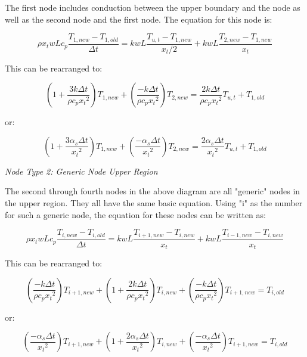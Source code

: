 The first node includes conduction between the upper boundary and the node as well as the second node and the first node.  The equation for this node is:

\begin{equation}
\rho x_t w L c_p \frac{T_{1,new} - T_{1,old}}{\Delta t} = k w L \frac{T_{u,t}-T_{1,new}}{x_t / 2} + k w L \frac{T_{2,new}-T_{1,new}}{x_t}
\end{equation}

This can be rearranged to:

\begin{equation}
(1 + \frac{3 k \Delta t}{\rho c_p {x_t}^2}) T_{1,new} + (\frac{-k \Delta t}{\rho c_p {x_t}^2}) T_{2,new} = \frac{2 k \Delta t}{\rho c_p {x_t}^2} T_{u,t} + T_{1,old}
\end{equation}

or:

\begin{equation}
(1 + \frac{3 \alpha_s \Delta t}{{x_t}^2}) T_{1,new} + (\frac{-\alpha_s \Delta t}{{x_t}^2}) T_{2,new} = \frac{2 \alpha_s \Delta t}{{x_t}^2} T_{u,t} + T_{1,old}
\end{equation}


\emph{\textit{Node Type 2: Generic Node Upper Region}}

The second through fourth nodes in the above diagram are all "generic" nodes in the upper region.  They all have the same basic equation.  Using "i" as the number for such a generic node, the equation for these nodes can be written as:

\begin{equation}
\rho x_t w L c_p \frac{T_{i,new} - T_{i,old}}{\Delta t} = k w L \frac{T_{i+1,new}-T_{i,new}}{x_t} + k w L \frac{T_{i-1,new}-T_{i,new}}{x_t}
\end{equation}

This can be rearranged to:

\begin{equation}
(\frac{-k \Delta t}{\rho c_p {x_t}^2}) T_{i+1,new} + (1 + \frac{2 k \Delta t}{\rho c_p {x_t}^2}) T_{i,new} + (\frac{-k \Delta t}{\rho c_p {x_t}^2}) T_{i+1,new} = T_{i,old}
\end{equation}

or:

\begin{equation}
(\frac{-\alpha_s \Delta t}{{x_t}^2}) T_{i+1,new} + (1 + \frac{2 \alpha_s \Delta t}{{x_t}^2}) T_{i,new} + (\frac{-\alpha_s \Delta t}{{x_t}^2}) T_{i+1,new} = T_{i,old}
\end{equation}


